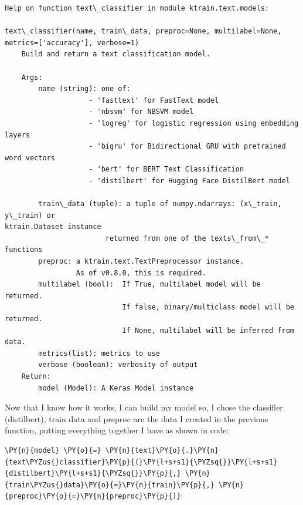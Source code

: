     \begin{Verbatim}[commandchars=\\\{\},fontsize=\footnotesize]
Help on function text\_classifier in module ktrain.text.models:

text\_classifier(name, train\_data, preproc=None, multilabel=None,
metrics=['accuracy'], verbose=1)
    Build and return a text classification model.

    Args:
        name (string): one of:
                    - 'fasttext' for FastText model
                    - 'nbsvm' for NBSVM model
                    - 'logreg' for logistic regression using embedding layers
                    - 'bigru' for Bidirectional GRU with pretrained word vectors
                    - 'bert' for BERT Text Classification
                    - 'distilbert' for Hugging Face DistilBert model

        train\_data (tuple): a tuple of numpy.ndarrays: (x\_train, y\_train) or
ktrain.Dataset instance
                        returned from one of the texts\_from\_* functions
        preproc: a ktrain.text.TextPreprocessor instance.
                 As of v0.8.0, this is required.
        multilabel (bool):  If True, multilabel model will be returned.
                            If false, binary/multiclass model will be returned.
                            If None, multilabel will be inferred from data.
        metrics(list): metrics to use
        verbose (boolean): verbosity of output
    Return:
        model (Model): A Keras Model instance

    \end{Verbatim}

Now that I know how it works, I can build my model so, I chose the classifier (distilbert), train data and preproc are the data I created in the previous function, putting everything together I have as shown in code:
    \begin{tcolorbox}[breakable, size=fbox, boxrule=1pt, pad at break*=1mm,colback=cellbackground, colframe=cellborder]
\begin{Verbatim}[commandchars=\\\{\},fontsize=\footnotesize]
\PY{n}{model} \PY{o}{=} \PY{n}{text}\PY{o}{.}\PY{n}{text\PYZus{}classifier}\PY{p}{(}\PY{l+s+s1}{\PYZsq{}}\PY{l+s+s1}{distilbert}\PY{l+s+s1}{\PYZsq{}}\PY{p}{,} \PY{n}{train\PYZus{}data}\PY{o}{=}\PY{n}{train}\PY{p}{,} \PY{n}{preproc}\PY{o}{=}\PY{n}{preproc}\PY{p}{)}
\end{Verbatim}
\end{tcolorbox}

